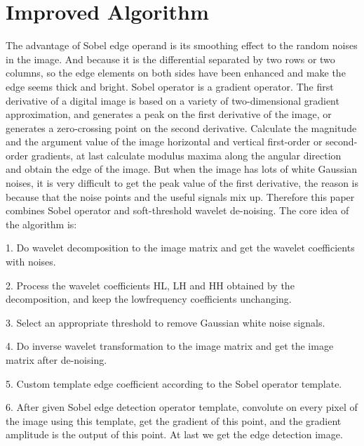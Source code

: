 \documentclass[BTech]{srmuthesis}
\begin{document}
\section{Improved Algorithm}
The advantage of Sobel edge operand is its smoothing
effect to the random noises in the image. And because it is
the differential separated by two rows or two columns, so the
edge elements on both sides have been enhanced and make
the edge seems thick and bright. Sobel operator is a gradient
operator. The first derivative of a digital image is based on a
variety of two-dimensional gradient approximation, and
generates a peak on the first derivative of the image, or
generates a zero-crossing point on the second derivative.
Calculate the magnitude and the argument value of the image
horizontal and vertical first-order or second-order gradients,
at last calculate modulus maxima along the angular direction
and obtain the edge of the image. But when the image has
lots of white Gaussian noises, it is very difficult to get the
peak value of the first derivative, the reason is because that
the noise points and the useful signals mix up. Therefore this
paper combines Sobel operator and soft-threshold wavelet
de-noising. The core idea of the algorithm is:

1. Do wavelet decomposition to the image matrix
and get the wavelet coefficients with noises.

2. Process the wavelet coefficients HL, LH and HH
obtained by the decomposition, and keep the lowfrequency
coefficients unchanging.

3. Select an appropriate threshold to remove
Gaussian white noise signals.

4. Do inverse wavelet transformation to the image
matrix and get the image matrix after de-noising.

5. Custom template edge coefficient according to the
Sobel operator template.

6. After given Sobel edge detection operator
template, convolute on every pixel of the image
using this template, get the gradient of this point,
and the gradient amplitude is the output of this
point. At last we get the edge detection image.
 


\end{document}
